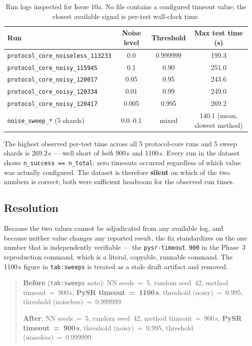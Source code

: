 \documentclass[11pt]{article}
\begin{document}
\begin{table}[h]
\centering
\caption{Run logs inspected for Issue 10a. No file contains a configured
timeout value; the closest available signal is per-test wall-clock time.}
\label{tab:runlogs}
\small
\begin{tabular}{@{}lccc@{}}
\toprule
\textbf{Run} & \textbf{Noise level} & \textbf{Threshold} & \textbf{Max test time (s)} \\
\midrule
\texttt{protocol\_core\_noiseless\_113233} & 0.0   & 0.999999 & 199.3 \\
\texttt{protocol\_core\_noisy\_115945}     & 0.1   & 0.90     & 251.0 \\
\texttt{protocol\_core\_noisy\_120017}     & 0.05  & 0.95     & 243.6 \\
\texttt{protocol\_core\_noisy\_120334}     & 0.01  & 0.99     & 249.0 \\
\texttt{protocol\_core\_noisy\_120417}     & 0.005 & 0.995    & 269.2 \\
\texttt{noise\_sweep\_*} (5 shards)        & 0.0--0.1 & mixed & 140.1 (mean, slowest method) \\
\bottomrule
\end{tabular}
\end{table}

The highest observed per-test time across all 5 protocol-core runs and 5
sweep shards is 269.2\,s — well short of \emph{both} 900\,s and 1100\,s.
Every run in the dataset shows \texttt{n\_success == n\_total}: zero
timeouts occurred regardless of which value was actually configured. The
dataset is therefore \textbf{silent} on which of the two numbers is
correct; both were sufficient headroom for the observed run times.

\subsection{Resolution}

Because the two values cannot be adjudicated from any available log, and
because neither value changes any reported result, the fix standardizes
on the one number that is independently verifiable — the \texttt{pysr-timeout
900} in the Phase~3 reproduction command, which is a literal, copyable,
runnable command. The 1100\,s figure in \texttt{tab:sweeps} is treated as
a stale draft artifact and removed.

\begin{quote}
\textbf{Before} (\texttt{tab:sweeps} note): NN seeds~=~5, random seed~42,
method timeout~=~900\,s, \textbf{PySR timeout~=~1100\,s}, threshold
(noisy)~=~0.995, threshold (noiseless)~=~0.999999.

\textbf{After}: NN seeds~=~5, random seed~42, method timeout~=~900\,s,
\textbf{PySR timeout~=~900\,s}, threshold (noisy)~=~0.995, threshold
(noiseless)~=~0.999999.
\end{quote}
\end{document}
